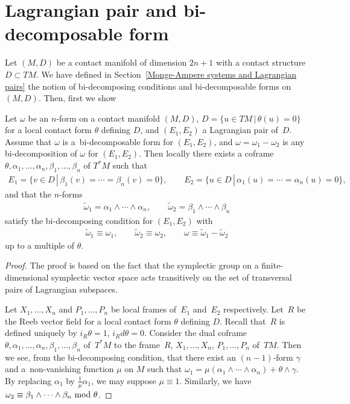 \section{Lagrangian pair and bi-decomposable form}
\label{Lagrangian pair and bi-decomposable forms.}

Let $(M, D)$ be a contact manifold of dimension $2n+1$ with
a contact structure $D \subset TM$.
We have def\/ined in Section~\ref{Monge-Ampere systems and Lagrangian pairs} the notion of bi-decomposing
conditions and bi-decomposable forms on~$(M, D)$.
Then, f\/irst we show

\begin{Lem}
\label{bi-decomposability}
Let $\omega$ be an $n$-form on a contact manifold $(M, D)$,
$D = \{ u \in TM \,|\, \theta(u) = 0\}$
for a local contact form $\theta$ defining $D$,
and $(E_1, E_2)$
a Lagrangian pair of~$D$.
Assume that $\omega$ is
a~bi-decomposable form for $(E_1, E_2)$,
and $\omega = \omega_1 - \omega_2$ is
any bi-decomposition of $\omega$ for $(E_1, E_2)$.
Then locally there exists a coframe
$\theta, \alpha_1, \dots, \alpha_n, \beta_1, \dots, \beta_n$
of $T^*M$ such that
\begin{gather*}
E_1 = \{ v \in D \,|\, \beta_1(v) = \cdots = \beta_n(v) = 0\}, \qquad
E_2 = \{ u \in D \,|\, \alpha_1(u) = \cdots = \alpha_n(u) = 0\},
\end{gather*}
and that the $n$-forms
\begin{gather*}
\widetilde{\omega}_1 = \alpha_1\wedge \cdots \wedge \alpha_n,
\qquad
\widetilde{\omega}_2 = \beta_1\wedge \cdots \wedge \beta_n
\end{gather*}
satisfy the bi-decomposing condition for
$(E_1, E_2)$ with
\begin{gather*}
\widetilde{\omega}_1 \equiv \omega_1, \qquad
\widetilde{\omega}_2 \equiv \omega_2, \qquad
\omega \equiv \widetilde{\omega}_1 - \widetilde{\omega}_2
\end{gather*}
up to a multiple of $\theta$.
\end{Lem}

\begin{proof}
The proof is based on the fact that the symplectic group on a f\/inite-dimensional symplectic vector space
acts transitively on the set of transversal pairs of Lagrangian subspaces.

Let $X_1, \dots, X_n$ and $P_1, \dots, P_n$ be local frames
of~$E_1$ and~$E_2$ respectively.
Let~$R$ be the Reeb vector f\/ield
for a local contact form $\theta$ def\/ining $D$. Recall that~$R$ is def\/ined uniquely by $i_R \theta = 1$, $i_R d\theta = 0$.
Consider
the dual coframe $\theta, \alpha_1,\dots,\alpha_n, \beta_1,\dots,\beta_n$
of~$T^*M$
to the frame~$R$, $X_1, \dots, X_n$, $P_1, \dots, P_n$ of~$TM$.
Then we see, from the bi-decomposing condition,
that there exist an $(n-1)$-form $\gamma$ and a~non-vanishing function $\mu$ on $M$ such that
$\omega_1 = \mu(\alpha_1 \wedge \cdots \wedge \alpha_n) + \theta\wedge\gamma$.
By replacing $\alpha_1$ by $\frac1{\mu}\alpha_1$,
we may suppose $\mu \equiv 1$.
Similarly, we have $\omega_2 \equiv
\beta_1 \wedge \cdots \wedge \beta_n \ \rm{mod}\ \theta$.
\end{proof}


